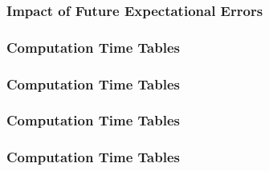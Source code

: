 \documentclass{beamer}
\begin{document}
    \begin{frame}
      \frametitle{Impact of Future Expectational Errors}
      
{\small

}
    \end{frame}

  
%     



  
%     

%  


    \begin{frame}
      \frametitle{Computation Time Tables}



  
{\tiny
  
}
    \end{frame}


    \begin{frame}
      \frametitle{Computation Time Tables}
  
 {\tiny
     
 }
    \end{frame}




    \begin{frame}
      \frametitle{Computation Time Tables}
  
 {\tiny
     
 }
    \end{frame}


    \begin{frame}
      \frametitle{Computation Time Tables}
  
 {\tiny
     
 }
    \end{frame}
\end{document}
